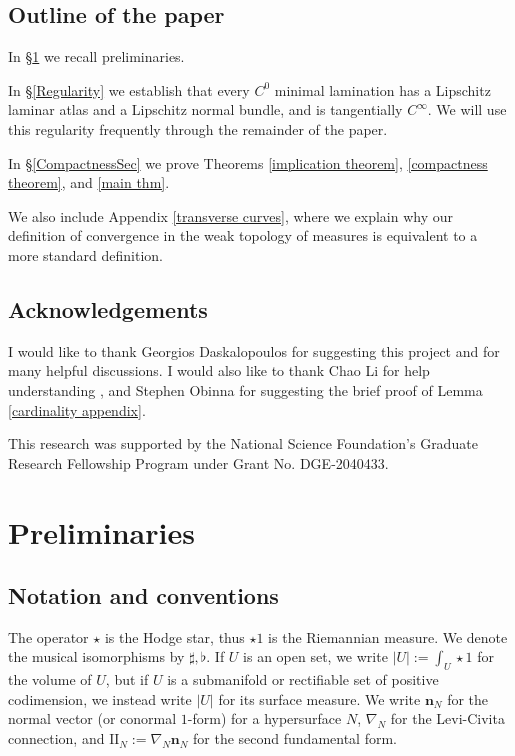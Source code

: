 \documentclass[reqno,11pt]{amsart}
\newcommand{\Two}{\mathrm{I\!I}}
\newcommand{\normal}{\mathbf n}
\theoremstyle{definition}
\numberwithin{equation}{section}
\begin{document}
\subsection{Outline of the paper}
In \S\ref{Prelims} we recall preliminaries.

In \S\ref{Regularity} we establish that every $C^0$ minimal lamination has a Lipschitz laminar atlas and a Lipschitz normal bundle, and is tangentially $C^\infty$.
We will use this regularity frequently through the remainder of the paper.

In \S\ref{CompactnessSec} we prove Theorems \ref{implication theorem}, \ref{compactness theorem}, and \ref{main thm}.

We also include Appendix \ref{transverse curves}, where we explain why our definition of convergence in the weak topology of measures is equivalent to a more standard definition.


\subsection{Acknowledgements}
I would like to thank Georgios Daskalopoulos for suggesting this project and for many helpful discussions.
I would also like to thank Chao Li for help understanding \cite{Chodosh2021}, and Stephen Obinna for suggesting the brief proof of Lemma \ref{cardinality appendix}.

This research was supported by the National Science Foundation's Graduate Research Fellowship Program under Grant No. DGE-2040433.




\section{Preliminaries}\label{Prelims}
\subsection{Notation and conventions}
The operator $\star$ is the Hodge star, thus $\star 1$ is the Riemannian measure.
We denote the musical isomorphisms by $\sharp, \flat$.
If $U$ is an open set, we write $|U| := \int_U \star 1$ for the volume of $U$, but if $U$ is a submanifold or rectifiable set of positive codimension, we instead write $|U|$ for its surface measure.
We write $\normal_N$ for the normal vector (or conormal $1$-form) for a hypersurface $N$, $\nabla_N$ for the Levi-Civita connection, and $\Two_N := \nabla_N \normal_N$ for the second fundamental form.
\end{document}
